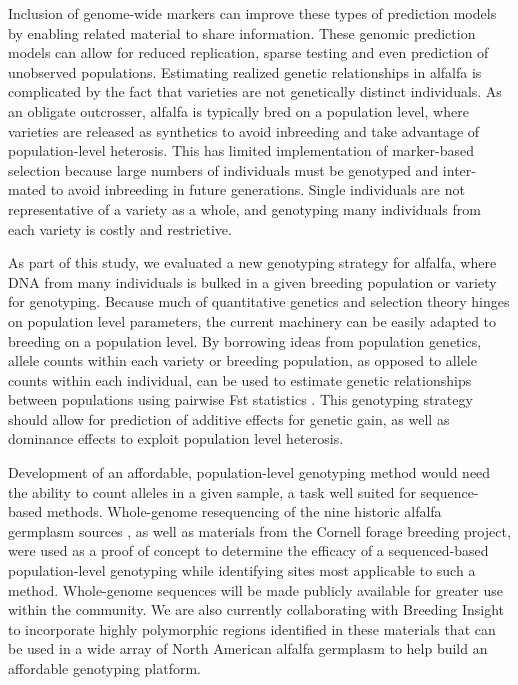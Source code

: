 \documentclass[12pt, letterpaper]{article}
\begin{document}

Inclusion of genome-wide markers can improve these types of prediction models by enabling related material to share information. These genomic prediction models can allow for reduced replication, sparse testing and even prediction of unobserved populations. Estimating realized genetic relationships in alfalfa is complicated by the fact that varieties are not genetically distinct individuals. As an obligate outcrosser, alfalfa is typically bred on a population level, where varieties are released as synthetics to avoid inbreeding and take advantage of population-level heterosis. This has limited implementation of marker-based selection because large numbers of individuals must be genotyped and inter-mated to avoid inbreeding in future generations. Single individuals are not representative of a variety as a whole, and genotyping many individuals from each variety is costly and restrictive. 

As part of this study, we evaluated a new genotyping strategy for alfalfa, where DNA from many individuals is bulked in a given breeding population or variety for genotyping. Because much of quantitative genetics and selection theory hinges on population level parameters, the current machinery can be easily adapted to breeding on a population level. By borrowing ideas from population genetics, allele counts within each variety or breeding population, as opposed to allele counts within each individual, can be used to estimate genetic relationships between populations using pairwise Fst statistics \parencite{weir2002}. This genotyping strategy should allow for prediction of additive effects for genetic gain, as well as dominance effects to exploit population level heterosis. 

Development of an affordable, population-level genotyping method would need the ability to count alleles in a given sample, a task well suited for sequence-based methods. Whole-genome resequencing of the nine historic alfalfa germplasm sources \parencite{barnes1977, segovia2004}, as well as materials from the Cornell forage breeding project, were used as a proof of concept to determine the efficacy of a sequenced-based population-level genotyping while identifying sites most applicable to such a method. Whole-genome sequences will be made publicly available for greater use within the community. We are also currently collaborating with Breeding Insight to incorporate highly polymorphic regions identified in these materials that can be used in a wide array of North American alfalfa germplasm to help build an affordable genotyping platform. 
\end{document}
